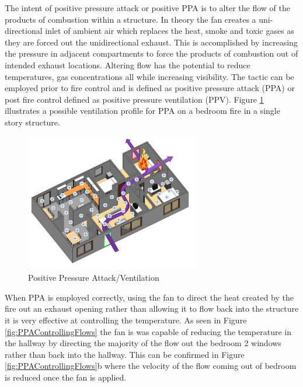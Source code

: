 \documentclass{article}
\begin{document}
The intent of positive pressure attack or positive PPA is to alter the flow of the products of combustion within a structure. In theory the fan creates a uni-directional inlet of ambient air which replaces the heat, smoke and toxic gases as they are forced out the unidirectional exhaust. This is accomplished by increasing the pressure in adjacent compartments to force the products of combustion out of intended exhaust locations. Altering flow has the potential to reduce temperatures, gas concentrations all while increasing visibility. The tactic can be employed prior to fire control and is defined as positive pressure attack (PPA) or post fire control defined as positive pressure ventilation (PPV).  Figure \ref{fig:PPAConcept} illustrates a possible ventilation profile for PPA on a bedroom fire in a single story structure. 

\begin{figure}[H]
	\centering
	\includegraphics[width = 3in]{0_Images/Tactical_Considerations/Understanding_Basics/Positive_Pressure.jpg}
	\caption{Positive Pressure Attack/Ventilation}
	\label{fig:PPAConcept}
\end{figure}

When PPA is employed correctly, using the fan to direct the heat created by the fire out an exhaust opening rather than allowing it to flow back into the structure it is very effective at controlling the temperature. As seen in Figure \ref{fig:PPAControllingFlows} the fan is was capable of reducing the temperature in the hallway by directing the majority of the flow out the bedroom 2 windows rather than back into the hallway. This can be confirmed in Figure \ref{fig:PPAControllingFlows}b where the velocity of the flow coming out of bedroom is reduced once the fan is applied. 
\end{document}
